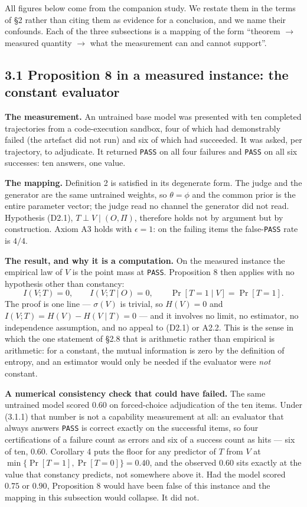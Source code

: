 \documentclass[11pt,a4paper]{article}
\begin{document}
All figures below come from the companion study. We restate them in the terms of
§2 rather than citing them as evidence for a conclusion, and we name their
confounds. Each of the three subsections is a mapping of the form
``theorem \(\to\) measured quantity \(\to\) what the measurement can and cannot
support''.

\subsection{3.1 Proposition 8 in a measured instance: the constant evaluator}\label{proposition-8-in-a-measured-instance-the-constant-evaluator}

\textbf{The measurement.} An untrained base model was presented with ten completed
trajectories from a code-execution sandbox, four of which had demonstrably failed
(the artefact did not run) and six of which had succeeded. It was asked, per
trajectory, to adjudicate. It returned \texttt{PASS} on all four failures and \texttt{PASS} on
all six successes: ten answers, one value.

\textbf{The mapping.} Definition 2 is satisfied in its degenerate form. The judge and
the generator are the same untrained weights, so \(\theta=\phi\) and the common prior
is the entire parameter vector; the judge read no channel the generator did not
read. Hypothesis (D2.1), \(T\perp V\mid(O,\Pi)\), therefore holds not by argument but
by construction. Axiom A3 holds with \(\epsilon=1\): on the failing items the
false-\texttt{PASS} rate is \(4/4\).

\textbf{The result, and why it is a computation.} On the measured instance the empirical
law of \(V\) is the point mass at \texttt{PASS}. Proposition 8 then applies with no
hypothesis other than constancy:
\begin{equation}
I(V;T)=0,\qquad I(V;T\mid O)=0,\qquad \Pr[T=1\mid V]=\Pr[T=1].
\tag{3.1.1}
\end{equation}
The proof is one line --- \(\sigma(V)\) is trivial, so \(H(V)=0\) and
\(I(V;T)=H(V)-H(V\mid T)=0\) --- and it involves no limit, no estimator, no
independence assumption, and no appeal to (D2.1) or A2.2. This is the sense in
which the one statement of §2.8 that is arithmetic rather than empirical is
arithmetic: for a constant, the mutual information is zero by the definition of entropy, and an
estimator would only be needed if the evaluator were \emph{not} constant.

\textbf{A numerical consistency check that could have failed.} The same untrained model
scored \(0.60\) on forced-choice adjudication of the ten items. Under (3.1.1) that
number is not a capability measurement at all: an evaluator that always answers
\texttt{PASS} is correct exactly on the successful items, so four certifications of a
failure count as errors and six of a success count as hits --- six of ten, \(0.60\).
Corollary 4 puts the floor for any predictor of \(T\) from \(V\) at
\(\min\{\Pr[T=1],\Pr[T=0]\}=0.40\), and the observed \(0.60\) sits exactly at the value
that constancy predicts, not somewhere above it. Had the model scored \(0.75\) or
\(0.90\), Proposition 8 would have been false of this instance and the mapping in
this subsection would collapse. It did not.
\end{document}
